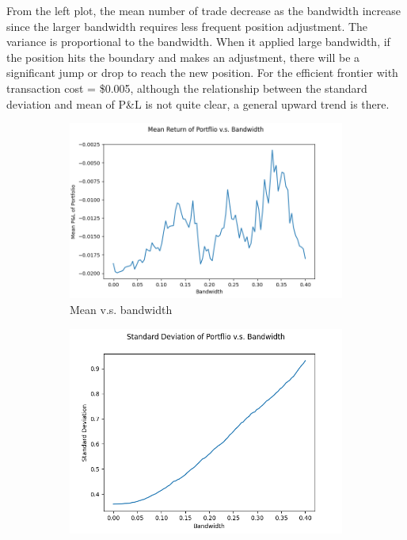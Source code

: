 \documentclass[12pt]{article}
\begin{document}
From the left plot, the mean number of trade decrease as the bandwidth increase since the larger bandwidth requires less frequent position adjustment. The variance is proportional to the bandwidth. When it applied large bandwidth, if the position hits the boundary and makes an adjustment, 
there will be a significant jump or drop to reach the new position. For the efficient frontier with transaction cost = \$0.005, although the relationship between the standard deviation and mean of P\&L is not quite clear, a general upward trend is there. 
\begin{figure}[H]
  \centering
  \begin{subfigure}{.5\textwidth}
    \centering
    \includegraphics[width=\linewidth]{mean.png}
    \caption{Mean v.s. bandwidth}
  \end{subfigure}%
  \begin{subfigure}{.5\textwidth}
    \centering
    \includegraphics[width=\linewidth]{std.png}

\end{subfigure}
\end{figure}
\end{document}
